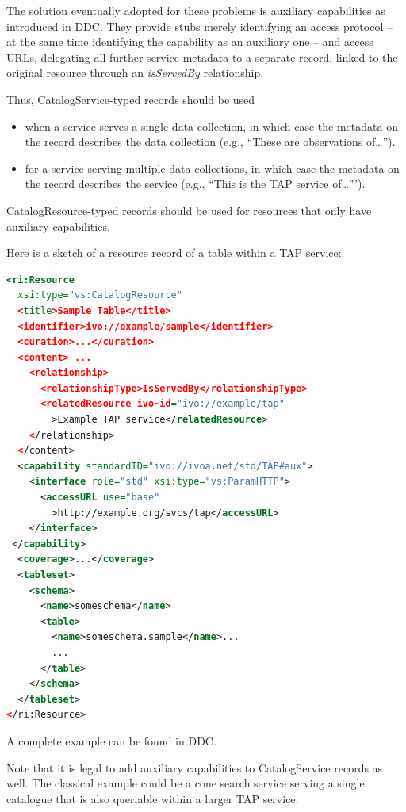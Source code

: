 \documentclass[11pt,a4paper]{ivoa}
\begin{document}
The solution eventually adopted for these problems is auxiliary
capabilities as introduced in DDC.  They provide stubs merely
identifying an access protocol -- at the same time identifying the
capability as an auxiliary one --  and access URLs, delegating all
further service metadata to a separate record, linked to the original
resource through an \emph{isServedBy} relationship.

Thus, CatalogService-typed records should be used

\begin{itemize}
\item when a service serves a single data collection, in which case the
metadata on the record describes the data collection (e.g., ``These are
observations of\dots'').
\item for a service serving multiple data collections, in which case the
metadata on the record  describes the service (e.g., ``This is the TAP
service of\dots''').
\end{itemize}

CatalogResource-typed records should be used for resources that only
have auxiliary capabilities.

Here is a sketch of a resource record of a table within a TAP service::

\begin{lstlisting}[language=XML,basicstyle=\footnotesize]
<ri:Resource
  xsi:type="vs:CatalogResource"
  <title>Sample Table</title>
  <identifier>ivo://example/sample</identifier>
  <curation>...</curation>
  <content> ...
    <relationship>
      <relationshipType>IsServedBy</relationshipType>
      <relatedResource ivo-id="ivo://example/tap"
        >Example TAP service</relatedResource>
    </relationship>
  </content>
  <capability standardID="ivo://ivoa.net/std/TAP#aux">
    <interface role="std" xsi:type="vs:ParamHTTP">
      <accessURL use="base"
        >http://example.org/svcs/tap</accessURL>
    </interface>
 </capability>
  <coverage>...</coverage>
  <tableset>
    <schema>
      <name>someschema</name>
      <table>
        <name>someschema.sample</name>...
        ...
      </table>
    </schema>
  </tableset>
</ri:Resource>
\end{lstlisting}

A complete example can be found in DDC.

Note that it is legal to add auxiliary capabilities to CatalogService
records as well.  The classical example could be a cone search service
serving a single catalogue that is also queriable within a larger TAP
service.
\end{document}
